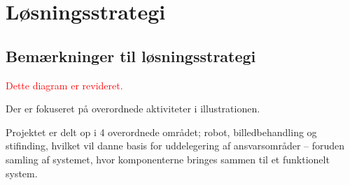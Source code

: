 \section{Løsningsstrategi}
\subsection{Bemærkninger til løsningsstrategi}
\textcolor{red}{Dette diagram er revideret.}

Der er fokuseret på overordnede aktiviteter i illustrationen.

Projektet er delt op i 4 overordnede området; robot, billedbehandling og stifinding, hvilket vil danne basis for uddelegering af ansvarsområder -- foruden samling af systemet, hvor komponenterne bringes sammen til et funktionelt system.